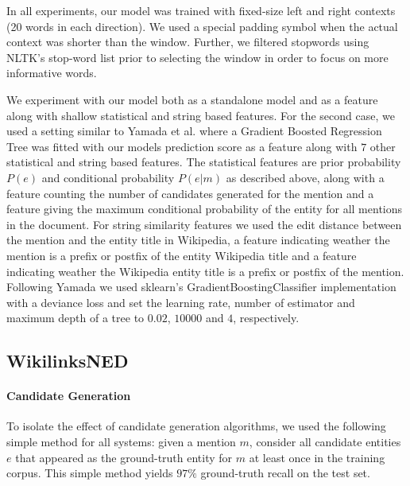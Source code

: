 \documentclass[11pt]{article}
\begin{document}
In all experiments, our model was trained with fixed-size left and right contexts (20 words in each direction). We used a special padding symbol when the actual context was shorter than the window. Further, we filtered stopwords using NLTK's stop-word list prior to selecting the window in order to focus on more informative words.

We experiment with our model both as a standalone model and as a feature along with shallow statistical and string based features. For the second case, we used a setting similar to Yamada et al.  where a Gradient Boosted Regression Tree was fitted with our models prediction score as a feature along with $7$ other statistical and string based features. The statistical features are prior probability $P(e)$ and conditional probability $P(e|m)$ as described above, along with a feature counting the number of candidates generated for the mention and a feature giving the maximum conditional probability of the entity for all mentions in the document. For string similarity features we used the edit distance between the mention and the entity title in Wikipedia, a feature indicating weather the mention is a prefix or postfix of the entity Wikipedia title and a feature indicating weather the Wikipedia entity title is a prefix or postfix of the mention. Following Yamada we used sklearn's GradientBoostingClassifier implementation \cite{pedregosa2011scikit} with a deviance loss and set the learning rate, number of estimator and maximum depth of a tree to $0.02$, $10000$ and $4$, respectively. 

\subsection{WikilinksNED}

\paragraph{Candidate Generation}
To isolate the effect of candidate generation algorithms, we used the following simple method for all systems: given a mention $m$, consider all candidate entities $e$ that appeared as the ground-truth entity for $m$ at least once in the training corpus. This simple method yields $97\%$ ground-truth recall on the test set.
\end{document}
